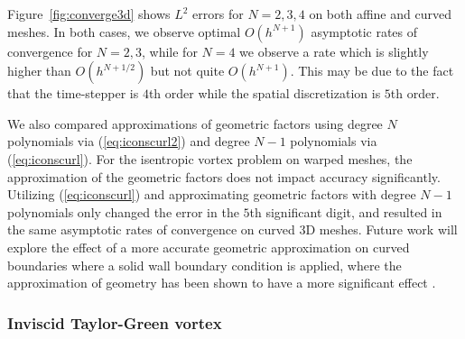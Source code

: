 \documentclass[10pt]{amsart}
\theoremstyle{definition}
\theoremstyle{lemma}
\theoremstyle{theorem}
\theoremstyle{assumption}
\newcommand{\note}[1]{{\color{blue}{#1}}}
\begin{document}
{Figure~\ref{fig:converge3d} shows $L^2$ errors for $N = 2,3,4$ on both affine and curved meshes.  In both cases, we observe optimal  $O(h^{N+1})$ asymptotic rates of convergence for $N = 2,3$, while for $N = 4$ we observe a rate which is slightly higher than $O(h^{N+1/2})$ but not quite $O(h^{N+1})$.  This may be due to the fact that the time-stepper is $4$th order while the spatial discretization is $5$th order.  

We also compared approximations of geometric factors using degree $N$ polynomials via (\ref{eq:iconscurl2}) and degree $N-1$ polynomials via (\ref{eq:iconscurl}).  For the isentropic vortex problem on warped meshes, the approximation of the geometric factors does not impact accuracy significantly.  Utilizing (\ref{eq:iconscurl}) and approximating geometric factors with degree $N-1$ polynomials only changed the error in the $5$th significant digit, and resulted in the same asymptotic rates of convergence on curved 3D meshes.  Future work will explore the effect of a more accurate geometric approximation on curved boundaries where a solid wall boundary condition is applied, where the approximation of geometry has been shown to have a more significant effect  \cite{toulorge2016optimizing}.  


\subsubsection{Inviscid Taylor-Green vortex}

}
\end{document}
